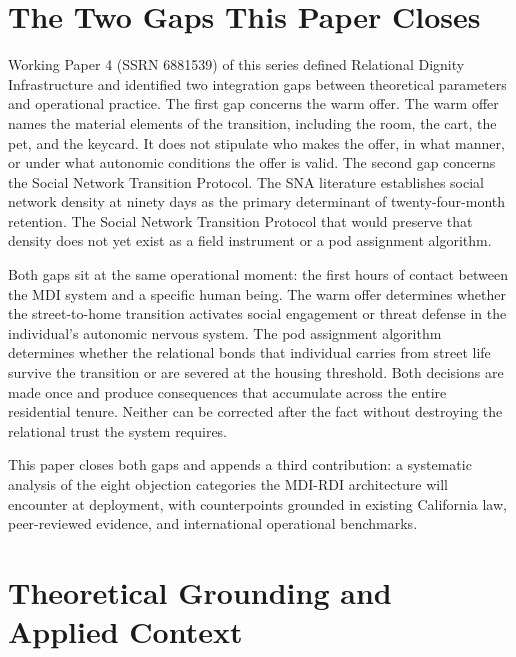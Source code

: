 \documentclass[12pt, letterpaper]{article}
\begin{document}
\newpage
\begingroup
{}
\setlength{\cftbeforesecskip}{2pt}
\setlength{\cftbeforesubsecskip}{-2pt}
\tableofcontents
\endgroup
\clearpage
{}

\clearpage
\section{The Two Gaps This Paper Closes}

Working Paper 4 (SSRN 6881539) of this series defined Relational Dignity Infrastructure and identified two integration gaps between theoretical parameters and operational practice. The first gap concerns the warm offer. The warm offer names the material elements of the transition, including the room, the cart, the pet, and the keycard. It does not stipulate who makes the offer, in what manner, or under what autonomic conditions the offer is valid. The second gap concerns the Social Network Transition Protocol. The SNA literature establishes social network density at ninety days as the primary determinant of twenty-four-month retention. The Social Network Transition Protocol that would preserve that density does not yet exist as a field instrument or a pod assignment algorithm.

Both gaps sit at the same operational moment: the first hours of contact between the MDI system and a specific human being. The warm offer determines whether the street-to-home transition activates social engagement or threat defense in the individual's autonomic nervous system. The pod assignment algorithm determines whether the relational bonds that individual carries from street life survive the transition or are severed at the housing threshold. Both decisions are made once and produce consequences that accumulate across the entire residential tenure. Neither can be corrected after the fact without destroying the relational trust the system requires.

This paper closes both gaps and appends a third contribution: a systematic analysis of the eight objection categories the MDI-RDI architecture will encounter at deployment, with counterpoints grounded in existing California law, peer-reviewed evidence, and international operational benchmarks.


\clearpage
\section{Theoretical Grounding and Applied Context}
\end{document}
